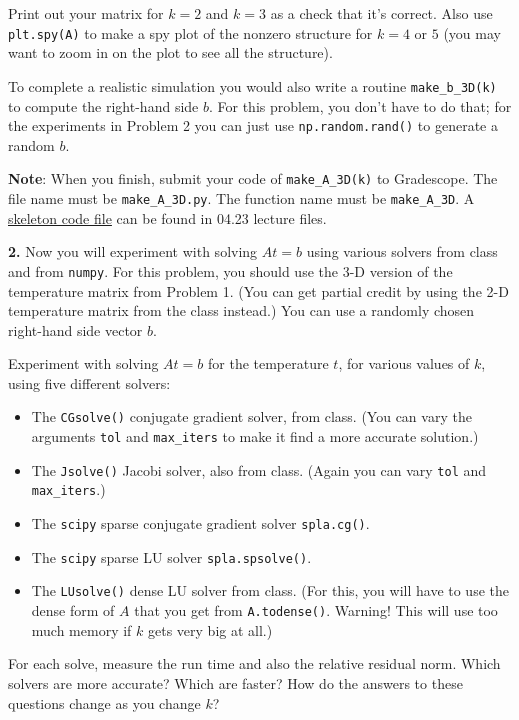 \documentclass[11pt]{article}
\begin{document}
Print out your matrix for $k=2$ and $k=3$ as a check that it's correct. 
Also use {\tt plt.spy(A)} to make a spy plot of the nonzero structure 
for $k=4$ or $5$ (you may want to zoom in on the plot to see all the structure).

To complete a realistic simulation you would also 
write a routine {\tt make\_b\_3D(k)} to compute the right-hand side $b$.
For this problem, you don't have to do that; 
for the experiments in Problem 2 you can just use {\tt np.random.rand()}
to generate a random $b$.

{\bf Note}:
When you finish, submit your code of {\tt make\_A\_3D(k)} to Gradescope.
The file name must be {\tt make\_A\_3D.py}.
The function name must be {\tt make\_A\_3D}.
A \href{https://github.com/ucsb-cs111/s19-lecture-files/blob/master/04.23/make_A_3D.py}
{skeleton code file} can be found in 04.23 lecture files.
\newpage

\par\bigskip
{\bf 2.} 
Now you will experiment with solving $At=b$ using various solvers
from class and from {\tt numpy}.
For this problem, you should use the 3-D version of the temperature matrix
from Problem 1. 
(You can get partial credit by using the 2-D temperature matrix from the
class instead.)
You can use a randomly chosen right-hand side vector $b$.

Experiment with solving $At=b$ for the temperature $t$, 
for various values of $k$, using five different solvers:
\begin{itemize}
\item The {\tt CGsolve()} conjugate gradient solver, from class.
(You can vary the arguments {\tt tol} and {\tt max\_iters} to
make it find a more accurate solution.)
\item The {\tt Jsolve()} Jacobi solver, also from class.
(Again you can vary {\tt tol} and {\tt max\_iters}.)
\item The {\tt scipy} sparse conjugate gradient solver {\tt spla.cg()}.
\item The {\tt scipy} sparse LU solver {\tt spla.spsolve()}.
\item The {\tt LUsolve()} dense LU solver from class.
(For this, you will have to use the dense form of $A$ that you get
from {\tt A.todense()}. Warning! This will use too much memory if
$k$ gets very big at all.)
\end{itemize}
For each solve, measure the run time and also the relative residual norm.
Which solvers are more accurate? Which are faster? How do the
answers to these questions change as you change $k$?
\end{document}
